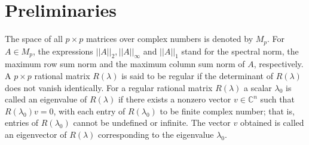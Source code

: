 \documentclass[12pt, reqno]{amsart}
\theoremstyle{definition}
\theoremstyle{remark}
\numberwithin{equation}{section}
\begin{document}
\section{Preliminaries}\hspace*{\fill}
\label{sec-2}

The space of all $p \times p$ matrices over complex numbers is denoted by $M_{p}$. 
For $A \in M_p$, the expressions $||A||_2, ||A||_\infty$ and $||A||_1$ stand for the spectral norm, the maximum row sum norm and the maximum column 
sum norm of $A$, respectively. A $p\times p$ rational matrix $R(\lambda)$ is 
said to be regular if the determinant of $R(\lambda)$ does not vanish identically. 
For a regular rational matrix $R(\lambda)$ a scalar $\lambda_0$ is called an 
eigenvalue of $R(\lambda)$ if there exists a nonzero vector $v \in \mathbb{C}^n$ 
such that $R(\lambda_0)v=0$, with each entry of $R(\lambda_0)$ to be finite complex 
number; that is, entries of $R(\lambda_0)$ cannot be undefined or infinite. 
The vector $v$ obtained is called an eigenvector of $R(\lambda)$ corresponding 
to the eigenvalue $\lambda_0$.
\end{document}

